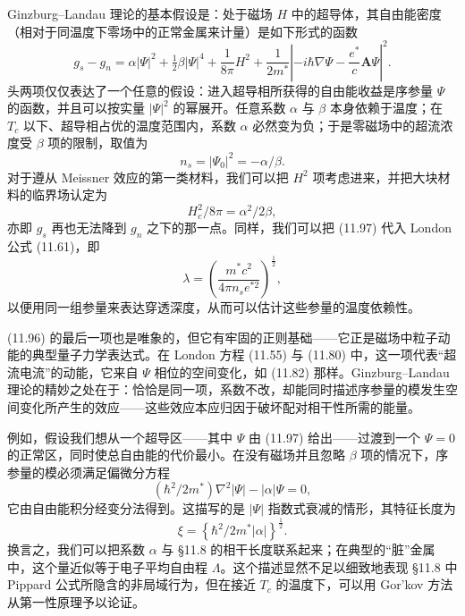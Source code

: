 Ginzburg--Landau 理论的基本假设是：处于磁场 $H$ 中的超导体，其自由能密度（相对于同温度下零场中的正常金属来计量）是如下形式的函数
\begin{equation*}
g_s - g_n = \alpha|\Psi|^{2} + \tfrac{1}{2}\beta|\Psi|^{4} + \frac{1}{8\pi}H^{2} + \frac{1}{2m^{*}}\left|-i\hbar\nabla\Psi - \frac{e^{*}}{c}\mathbf{A}\Psi\right|^{2}.
\tag{11.96}
\end{equation*}
头两项仅仅表达了一个任意的假设：进入超导相所获得的自由能收益是序参量 $\Psi$ 的函数，并且可以按实量 $|\Psi|^{2}$ 的幂展开。任意系数 $\alpha$ 与 $\beta$ 本身依赖于温度；在 $T_c$ 以下、超导相占优的温度范围内，系数 $\alpha$ 必然变为负；于是零磁场中的超流浓度受 $\beta$ 项的限制，取值为
\begin{equation*}
n_s = |\Psi_0|^{2} = -\alpha/\beta.
\tag{11.97}
\end{equation*}
对于遵从 Meissner 效应的第一类材料，我们可以把 $H^{2}$ 项考虑进来，并把大块材料的临界场认定为
\begin{equation*}
H_c^{2}/8\pi = \alpha^{2}/2\beta,
\tag{11.98}
\end{equation*}
亦即 $g_s$ 再也无法降到 $g_n$ 之下的那一点。同样，我们可以把 (11.97) 代入 London 公式 (11.61)，即
\begin{equation*}
\lambda = \left(\frac{m^{*}c^{2}}{4\pi n_s e^{*2}}\right)^{\frac{1}{2}},
\tag{11.99}
\end{equation*}
以便用同一组参量来表达穿透深度，从而可以估计这些参量的温度依赖性。

(11.96) 的最后一项也是唯象的，但它有牢固的正则基础——它正是磁场中粒子动能的典型量子力学表达式。在 London 方程 (11.55) 与 (11.80) 中，这一项代表“超流电流”的动能，它来自 $\Psi$ 相位的空间变化，如 (11.82) 那样。Ginzburg--Landau 理论的精妙之处在于：恰恰是同一项，系数不改，却能同时描述序参量的模发生空间变化所产生的效应——这些效应本应归因于破坏配对相干性所需的能量。

例如，假设我们想从一个超导区——其中 $\Psi$ 由 (11.97) 给出——过渡到一个 $\Psi = 0$ 的正常区，同时使总自由能的代价最小。在没有磁场并且忽略 $\beta$ 项的情况下，序参量的模必须满足偏微分方程
\begin{equation*}
(\hbar^{2}/2m^{*})\nabla^{2}|\Psi| - |\alpha|\Psi = 0,
\tag{11.100}
\end{equation*}
它由自由能积分经变分法得到。这描写的是 $|\Psi|$ 指数式衰减的情形，其特征长度为
\begin{equation*}
\xi = \left\{\hbar^{2}/2m^{*}|\alpha|\right\}^{\frac{1}{2}}.
\tag{11.101}
\end{equation*}
换言之，我们可以把系数 $\alpha$ 与 §11.8 的相干长度联系起来；在典型的“脏”金属中，这个量近似等于电子平均自由程 $\Lambda$。这个描述显然不足以细致地表现 §11.8 中 Pippard 公式所隐含的非局域行为，但在接近 $T_c$ 的温度下，可以用 Gor'kov 方法从第一性原理予以论证。

